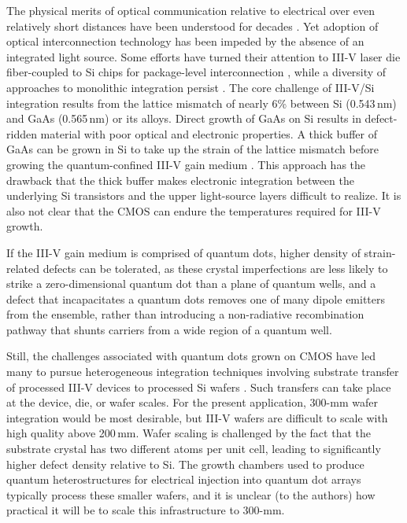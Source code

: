 \documentclass[twocolumn]{article}
\begin{document}
The physical merits of optical communication relative to electrical over even relatively short distances have been understood for decades \cite{gole1984,mi1989,mi2000}. Yet adoption of optical interconnection technology has been impeded by the absence of an integrated light source. Some efforts have turned their attention to III-V laser die fiber-coupled to Si chips for package-level interconnection \cite{suwa2015}, while a diversity of approaches to monolithic integration persist \cite{crsa2017,zhha2018,huli2019,szha2019,haxu2021}. The core challenge of III-V/Si integration results from the lattice mismatch of nearly 6\% between Si (0.543\,nm) and GaAs (0.565\,nm) or its alloys. Direct growth of GaAs on Si results in defect-ridden material with poor optical and electronic properties. A thick buffer of GaAs can be grown in Si to take up the strain of the lattice mismatch before growing the quantum-confined III-V gain medium \cite{chli2016}. This approach has the drawback that the thick buffer makes electronic integration between the underlying Si transistors and the upper light-source layers difficult to realize. It is also not clear that the CMOS can endure the temperatures required for III-V growth. 

If the III-V gain medium is comprised of quantum dots, higher density of strain-related defects can be tolerated, as these crystal imperfections are less likely to strike a zero-dimensional quantum dot than a plane of quantum wells, and a defect that incapacitates a quantum dots removes one of many dipole emitters from the ensemble, rather than introducing a non-radiative recombination pathway that shunts carriers from a wide region of a quantum well. 

Still, the challenges associated with quantum dots grown on CMOS have led many to pursue heterogeneous integration techniques involving substrate transfer of processed III-V devices to processed Si wafers \cite{}. Such transfers can take place at the device, die, or wafer scales. For the present application, 300-mm wafer integration would be most desirable, but III-V wafers are difficult to scale with high quality above 200\,mm. Wafer scaling is challenged by the fact that the substrate crystal has two different atoms per unit cell, leading to significantly higher defect density relative to Si. The growth chambers used to produce quantum heterostructures for electrical injection into quantum dot arrays typically process these smaller wafers, and it is unclear (to the authors) how practical it will be to scale this infrastructure to 300-mm. 
\end{document}
